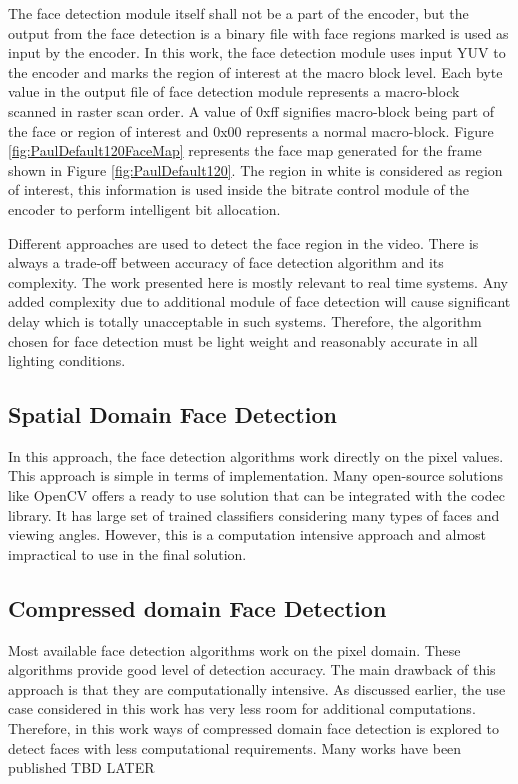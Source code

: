 \documentclass[11pt]{article} %
\begin{document}
 The face detection module itself shall not be a part of the encoder, but the output from the face detection is a binary file with face regions marked is used as input by the encoder. In this work, the face detection module uses input YUV to the encoder and marks the region of interest at the macro block level. Each byte value in the output file of face detection module represents a macro-block scanned in raster scan order. A value of 0xff signifies macro-block being part of the face or region of interest and 0x00 represents a normal macro-block. Figure \ref{fig:PaulDefault120FaceMap} represents the face map generated for the frame shown in Figure \ref{fig:PaulDefault120}. The region in white is considered as region of interest, this information is used inside the bitrate control module of the encoder to perform intelligent bit allocation.

Different approaches are used to detect the face region in the video. There is always a trade-off between accuracy of face detection algorithm and its complexity. The work presented here is mostly relevant to real time systems. Any added complexity due to additional module of face detection will cause significant delay which is totally unacceptable in such systems. Therefore, the algorithm chosen for face detection must be light weight and reasonably accurate in all lighting conditions. 

\subsection{Spatial Domain Face Detection}
In this approach, the face detection algorithms work directly on the pixel values. This approach is simple in terms of implementation. Many open-source solutions like OpenCV offers a ready to use solution that can be integrated with the codec library. It has large set of trained classifiers considering many types of faces and viewing angles. However, this is a computation intensive approach and almost impractical to use in the final solution. 
\subsection{Compressed domain Face Detection}
Most available face detection algorithms work on the pixel domain. These algorithms provide good level of detection accuracy. The main drawback of this approach is that they are computationally intensive. As discussed earlier, the use case considered in this work has very less room for additional computations. Therefore, in this work ways of compressed domain face detection is explored to detect faces with less computational requirements. 
Many works have been published
TBD LATER
\clearpage
%
%
% 
\end{document}
